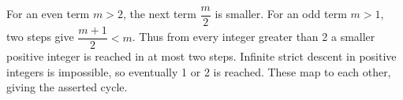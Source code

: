 For an even term $m>2$, the next term $\dfrac{m}{2}$ is smaller. For an odd term $m>1$, two steps give $\dfrac{m+1}{2}<m$. Thus from every integer greater than 2 a smaller positive integer is reached in at most two steps. Infinite strict descent in positive integers is impossible, so eventually 1 or 2 is reached. These map to each other, giving the asserted cycle.
